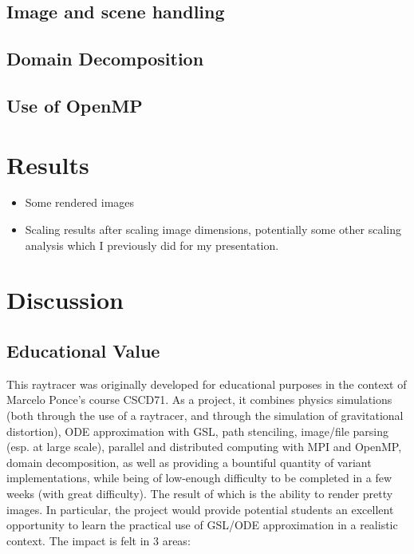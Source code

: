 \subsection {Image and scene handling}
\subsection {Domain Decomposition}
\subsection {Use of OpenMP}


\section{Results}
\label{sec:results}

\begin{itemize}
	\item Some rendered images
    	\item Scaling results after scaling image dimensions, potentially some other scaling analysis 
      which I previously did for my presentation.
\end{itemize}



\section{Discussion}
\label{sec:disc}

\subsection {Educational Value}


This raytracer was originally developed for educational purposes in the context of Marcelo Ponce's course CSCD71. As a project, it combines physics simulations (both through the use of a raytracer, and through the simulation of gravitational distortion), ODE approximation with GSL, path stenciling, image/file parsing (esp. at large scale), parallel and distributed computing with MPI and OpenMP, domain decomposition, as well as providing a bountiful quantity of variant implementations, while being of low-enough difficulty to be completed in a few weeks (with great difficulty). The result of which is the ability to render pretty images. In particular, the project would provide potential students an excellent opportunity to learn the practical use of GSL/ODE approximation in a realistic context. The impact is felt in 3 areas:

